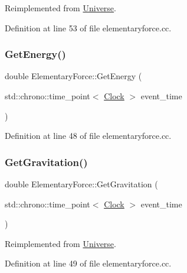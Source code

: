 Reimplemented from \mbox{\hyperlink{class_universe_a9f099605c082e7fa755787a6a8cab7ba}{Universe}}.



Definition at line 53 of file elementaryforce.\+cc.

\mbox{\label{class_elementary_force_af608447a2b6380142e2345ada11d1c32}} 
\subsubsection{\texorpdfstring{Get\+Energy()}{GetEnergy()}}
{\footnotesize\ttfamily double Elementary\+Force\+::\+Get\+Energy (\begin{DoxyParamCaption}\item[{std\+::chrono\+::time\+\_\+point$<$ \mbox{\hyperlink{universe_8h_a0ef8d951d1ca5ab3cfaf7ab4c7a6fd80}{Clock}} $>$}]{event\+\_\+time }\end{DoxyParamCaption})}



Definition at line 48 of file elementaryforce.\+cc.

\mbox{\label{class_elementary_force_a579afb8079668f0587096934d1de9c04}} 
\subsubsection{\texorpdfstring{Get\+Gravitation()}{GetGravitation()}}
{\footnotesize\ttfamily double Elementary\+Force\+::\+Get\+Gravitation (\begin{DoxyParamCaption}\item[{std\+::chrono\+::time\+\_\+point$<$ \mbox{\hyperlink{universe_8h_a0ef8d951d1ca5ab3cfaf7ab4c7a6fd80}{Clock}} $>$}]{event\+\_\+time }\end{DoxyParamCaption})\hspace{0.3cm}{\ttfamily [virtual]}}



Reimplemented from \mbox{\hyperlink{class_universe_ab0404e774ee0ed66b597ff5b8e989446}{Universe}}.



Definition at line 49 of file elementaryforce.\+cc.

